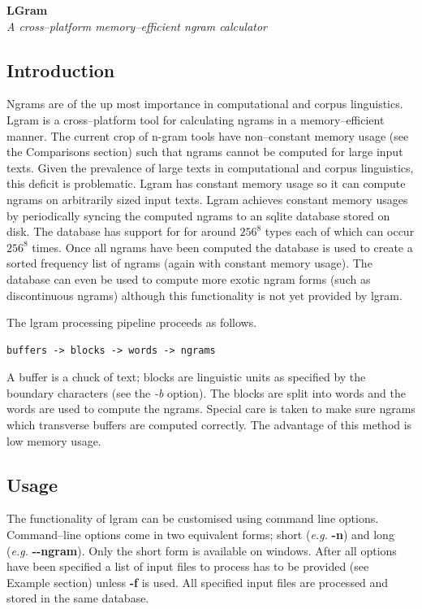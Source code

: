 \documentclass[12pt,a4paper]{report}
\begin{document}
\begin{center}
{\LARGE \bfseries LGram} \\[1em]
{\Large \it A cross--platform memory--efficient ngram calculator}
\end{center}

\subsection*{Introduction}
Ngrams are of the up most importance in computational and corpus linguistics. Lgram is a cross--platform tool for calculating ngrams in a memory--efficient manner. The current crop of n-gram tools have non--constant memory usage (see the Comparisons section) such that ngrams cannot be computed for large input texts. Given the prevalence of large texts in computational and corpus linguistics, this deficit is problematic. Lgram has constant memory usage so it can compute ngrams on arbitrarily sized input texts. Lgram achieves constant memory usages by periodically syncing the computed ngrams to an sqlite database stored on disk. The database has support for for around $256^8$ types each of which can occur $256^8$ times. Once all ngrams have been computed the database is used to create a sorted frequency list of ngrams (again with constant memory usage). The database can even be used to compute more exotic ngram forms (such as discontinuous ngrams) although this functionality is not yet provided by lgram.

The lgram processing pipeline proceeds as follows. 
\begin{center}
\begin{minipage}[h]{0.5\textwidth}
\begin{verbatim}
buffers -> blocks -> words -> ngrams
\end{verbatim}
\end{minipage}
\end{center}

A buffer is a chuck of text; blocks are linguistic units as specified by the boundary characters (see the \emph{-b} option). The blocks are split into words and the words are used to compute the ngrams. Special care is taken to make sure ngrams which transverse buffers are computed correctly. The advantage of this method is low memory usage.

\subsection*{Usage}
The functionality of lgram can be customised using command line options. Command--line options come in two equivalent forms; short (\emph{e.g.} \textbf{-n}) and long (\emph{e.g.} \textbf{-{}-ngram}). Only the short form is available on windows. After all options have been specified a list of input files to process has to be provided (see Example section) unless \textbf{-f} is used. All specified input files are processed and stored in the same database.
\end{document}
